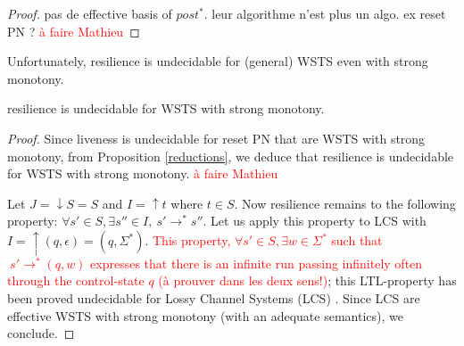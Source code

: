 \begin{proof}
pas de effective basis of $post^*$. leur algorithme n'est plus un algo. ex reset PN ?  \textcolor{red}{à faire Mathieu}
\end{proof}


Unfortunately, resilience is undecidable for (general) WSTS even with strong monotony.

\begin{theorem}
{\sc resilience} is undecidable for WSTS with strong monotony.
\end{theorem}


\begin{proof} 
Since liveness is undecidable for reset PN that are WSTS with strong monotony, from Proposition \ref{reductions}, we deduce that resilience is undecidable for WSTS with strong monotony.
  \textcolor{red}{à faire Mathieu}
  
Let $J=\downarrow S = S$ and $I = \uparrow t$ where $t \in S$. Now resilience remains to the following property: $\forall s' \in S,  \exists s'' \in I, ~ s' \rightarrow^{*} s''$. Let us apply this property to LCS with $I = \uparrow (q,\epsilon) = (q, \Sigma^*)$. \textcolor{red}{This property, $\forall s' \in S,  \exists w \in \Sigma^* $ such that $ ~ s' \rightarrow^{*} (q,w)$ expresses that there is an infinite run passing infinitely often through the control-state $q$ (à prouver dans les deux sens!)}; this LTL-property has been proved undecidable for Lossy Channel Systems (LCS) \cite{DBLP:conf/icalp/AbdullaJ94}.
Since LCS are effective WSTS with strong monotony (with an adequate semantics), we conclude.

\end{proof}
